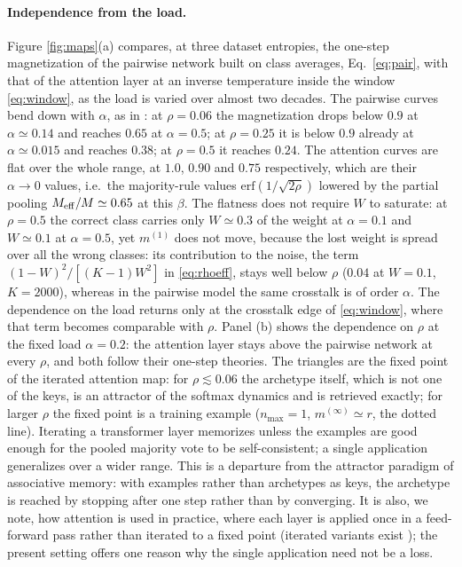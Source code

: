 \documentclass[11pt,a4paper]{article}
\newcommand{\Meff}{M_{\rm eff}}
\newcommand{\erf}{\mathrm{erf}}
\begin{document}
\paragraph{Independence from the load.} Figure \ref{fig:maps}(a) compares, at three dataset entropies, the one-step magnetization of the pairwise network built on class averages, Eq.\ \eqref{eq:pair}, with that of the attention layer at an inverse temperature inside the window \eqref{eq:window}, as the load is varied over almost two decades. The pairwise curves bend down with $\alpha$, as in \cite{Alemanno2023}: at $\rho=0.06$ the magnetization drops below $0.9$ at $\alpha\simeq0.14$ and reaches $0.65$ at $\alpha=0.5$; at $\rho=0.25$ it is below $0.9$ already at $\alpha\simeq0.015$ and reaches $0.38$; at $\rho=0.5$ it reaches $0.24$. The attention curves are flat over the whole range, at $1.0$, $0.90$ and $0.75$ respectively, which are their $\alpha\to0$ values, i.e.\ the majority-rule values $\erf(1/\sqrt{2\rho})$ lowered by the partial pooling $\Meff/M\simeq0.65$ at this $\beta$. The flatness does not require $W$ to saturate: at $\rho=0.5$ the correct class carries only $W\simeq0.3$ of the weight at $\alpha=0.1$ and $W\simeq0.1$ at $\alpha=0.5$, yet $m^{(1)}$ does not move, because the lost weight is spread over all the wrong classes: its contribution to the noise, the term $(1-W)^2/[(K-1)W^2]$ in \eqref{eq:rhoeff}, stays well below $\rho$ ($0.04$ at $W=0.1$, $K=2000$), whereas in the pairwise model the same crosstalk is of order $\alpha$. The dependence on the load returns only at the crosstalk edge of \eqref{eq:window}, where that term becomes comparable with $\rho$. Panel (b) shows the dependence on $\rho$ at the fixed load $\alpha=0.2$: the attention layer stays above the pairwise network at every $\rho$, and both follow their one-step theories. The triangles are the fixed point of the iterated attention map: for $\rho\lesssim0.06$ the archetype itself, which is not one of the keys, is an attractor of the softmax dynamics and is retrieved exactly; for larger $\rho$ the fixed point is a training example ($n_{\max}=1$, $m^{(\infty)}\simeq r$, the dotted line). Iterating a transformer layer memorizes unless the examples are good enough for the pooled majority vote to be self-consistent; a single application generalizes over a wider range. This is a departure from the attractor paradigm of associative memory: with examples rather than archetypes as keys, the archetype is reached by stopping after one step rather than by converging. It is also, we note, how attention is used in practice, where each layer is applied once in a feed-forward pass rather than iterated to a fixed point (iterated variants exist \cite{Hoover2024}); the present setting offers one reason why the single application need not be a loss.
\end{document}
